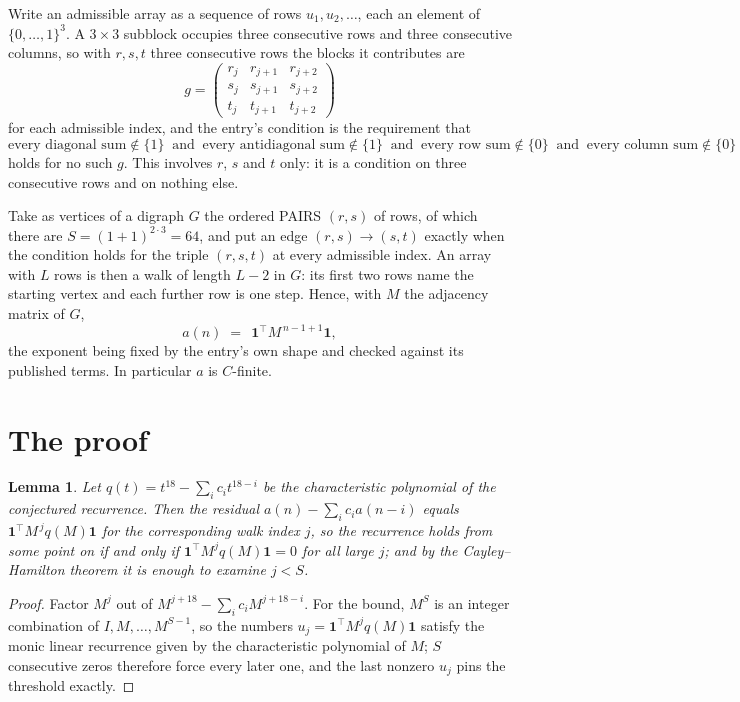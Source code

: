 \documentclass[11pt,a4paper]{article}
\theoremstyle{plain}
\newtheorem{lemma}[theorem]{Lemma}
\theoremstyle{definition}
\begin{document}
Write an admissible array as a sequence of rows $u_1,u_2,\dots$, each an element of
$\{0,\dots,1\}^{3}$. A $3\times3$ subblock occupies three consecutive rows and
three consecutive columns, so with $r,s,t$ three consecutive rows the blocks it
contributes are
\[
g=\begin{pmatrix}r_j&r_{j+1}&r_{j+2}\\ s_j&s_{j+1}&s_{j+2}\\ t_j&t_{j+1}&t_{j+2}\end{pmatrix}
\]
for each admissible index, and the entry's condition is the requirement that
\[
\text{every diagonal sum} \notin \{1\}\ \text{ and }\ \text{every antidiagonal sum} \notin \{1\}\ \text{ and }\ \text{every row sum} \notin \{0\}\ \text{ and }\ \text{every column sum} \notin \{0\}
\]
holds for no such $g$. This involves $r$, $s$ and $t$ only: it is a condition on
three consecutive rows and on nothing else.

Take as vertices of a digraph $G$ the ordered PAIRS $(r,s)$ of rows, of which there are
$S=(1+1)^{2\cdot3}=64$, and put an edge $(r,s)\to(s,t)$ exactly when the condition
holds for the triple $(r,s,t)$ at every admissible index. An array with $L$ rows is then a
walk of length $L-2$ in $G$: its first two rows name the starting vertex and each further
row is one step. Hence, with $M$ the adjacency matrix of $G$,
\[
a(n)\;=\;\,\mathbf{1}^{\!\top}M^{\,n-1+1}\mathbf{1},
\]
the exponent being fixed by the entry's own shape and checked against its published terms.
In particular $a$ is $C$-finite.

\section{The proof}

\begin{lemma}\label{lem:crit}
Let $q(t)=t^{18}-\sum_i c_it^{18-i}$ be the characteristic polynomial of the
conjectured recurrence. Then the residual $a(n)-\sum_ic_ia(n-i)$ equals
$\mathbf{1}^{\!\top}M^{\,j}q(M)\mathbf{1}$ for the corresponding walk index
$j$, so the recurrence holds from some point on if and only if
$\mathbf{1}^{\!\top}M^{j}q(M)\mathbf{1}=0$ for all large $j$; and by the
Cayley--Hamilton theorem it is enough to examine $j<S$.
\end{lemma}

\begin{proof}
Factor $M^{j}$ out of $M^{j+18}-\sum_ic_iM^{j+18-i}$. For the bound, $M^{S}$
is an integer combination of $I,M,\dots,M^{S-1}$, so the numbers
$u_j=\mathbf{1}^{\!\top}M^{j}q(M)\mathbf{1}$ satisfy the monic linear recurrence given by
the characteristic polynomial of $M$; $S$ consecutive zeros therefore force every later one,
and the last nonzero $u_j$ pins the threshold exactly.
\end{proof}
\end{document}
